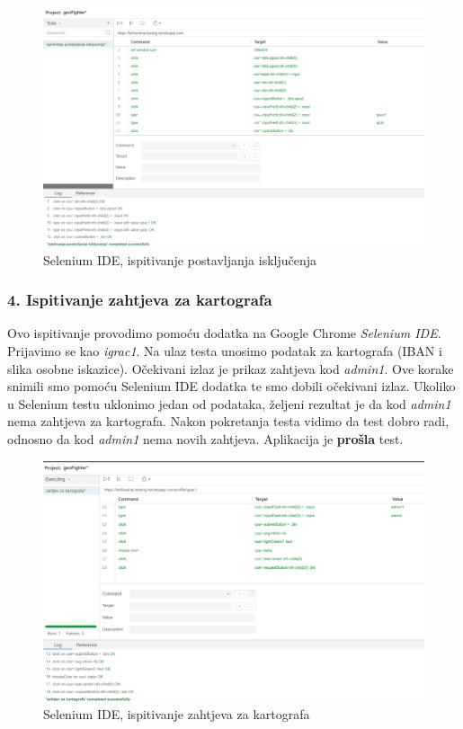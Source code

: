 					\begin{figure}[H]
						\includegraphics[width=\textwidth]{slike/SeleniumIDE_test1} 
						\centering
						\caption{Selenium IDE, ispitivanje postavljanja isključenja}
						\label{}
					\end{figure}
				\eject
			\subsubsection{4. Ispitivanje zahtjeva za kartografa}
			
				{Ovo ispitivanje provodimo pomoću dodatka na Google Chrome \emph{Selenium IDE}. Prijavimo se kao \emph{igrac1}. Na ulaz testa unosimo podatak za kartografa (IBAN i slika osobne iskazice). Očekivani izlaz je prikaz zahtjeva kod \emph{admin1}. Ove korake snimili smo pomoću Selenium IDE dodatka te smo dobili očekivani izlaz. Ukoliko u Selenium testu uklonimo jedan od podataka, željeni rezultat je da kod \emph{admin1} nema zahtjeva za kartografa. Nakon pokretanja testa vidimo da test dobro radi, odnosno da kod \emph{admin1} nema novih zahtjeva. Aplikacija je \textbf{prošla} test. }
					
					\begin{figure}[H]
						\includegraphics[width=\textwidth]{slike/SeleniumIDE_test2} 
						\centering
						\caption{Selenium IDE, ispitivanje zahtjeva za kartografa}
						\label{}
					\end{figure}
				
